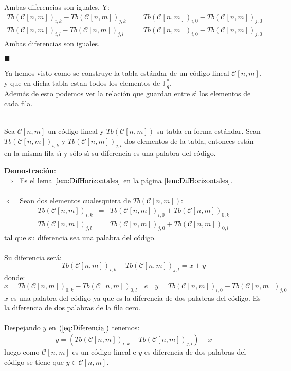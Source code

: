 Ambas diferencias son iguales. Y:
\begin{eqnarray*}
Tb(\mathcal{C}[n,m])_{i,k}-Tb(\mathcal{C}[n,m])_{j,k}&=&
Tb(\mathcal{C}[n,m])_{i,0}-Tb(\mathcal{C}[n,m])_{j,0}\\
Tb(\mathcal{C}[n,m])_{i,l}-Tb(\mathcal{C}[n,m])_{j,l}&=&
Tb(\mathcal{C}[n,m])_{i,0}-Tb(\mathcal{C}[n,m])_{j,0}
\end{eqnarray*}
Ambas diferencias son iguales.
\begin{flushright}
$\blacksquare$
\end{flushright}
%
%
Ya hemos visto como se construye la tabla est\'andar de un c\'odigo lineal 
$\mathcal{C}[n,m]$, y que en dicha tabla estan todos los elementos de
$\mathbb{F}^{^n}_q$.\\

Adem\'as de esto podemos ver la relaci\'on que guardan entre s\'{\i} los 
elementos de cada fila.
%
\newpage
%
\begin{teorema}\label{the:ElementosFila}
\ \\
Sea $\mathcal{C}[n,m]$ un c\'odigo lineal y $Tb(\mathcal{C}[n,m])$ su tabla en
forma est\'andar. Sean $Tb(\mathcal{C}[n,m])_{i,k}$ y
$Tb(\mathcal{C}[n,m])_{j,l}$ dos elementos de la tabla, entonces est\'an en la
misma fila s\'{\i} y s\'olo s\'{\i} su diferencia es una palabra del c\'odigo.
\end{teorema}
\underline{\textbf{Demostraci\'on}}:\\
$\Rightarrow |$ Es el lema $\ref{lem:DifHorizontales}$ en la p\'agina
$\pageref{lem:DifHorizontales}$.\\ \\
%
$\Leftarrow |$ Sean dos elementos cualesquiera de $Tb(\mathcal{C}[n,m])$:
\begin{eqnarray*}
Tb(\mathcal{C}[n,m])_{i,k}&=&Tb(\mathcal{C}[n,m])_{i,0}+
Tb(\mathcal{C}[n,m])_{0,k}\\
Tb(\mathcal{C}[n,m])_{j,l}&=&Tb(\mathcal{C}[n,m])_{j,0}+
Tb(\mathcal{C}[n,m])_{0,l}
\end{eqnarray*}
tal que su diferencia sea una palabra del c\'odigo.\\ \\
%
Su diferencia ser\'a:
\begin{equation} \label{eq:Diferencia}
Tb(\mathcal{C}[n,m])_{i,k}-Tb(\mathcal{C}[n,m])_{j,l} = x + y
\end{equation}
donde:
\begin{displaymath}
x=Tb(\mathcal{C}[n,m])_{0,k}-Tb(\mathcal{C}[n,m])_{0,l}\quad e\quad
y=Tb(\mathcal{C}[n,m])_{i,0}-Tb(\mathcal{C}[n,m])_{j,0}
\end{displaymath}
$x$ es una palabra del c\'odigo ya que es la diferencia de dos palabras
del c\'odigo. Es la diferencia de dos palabras de la fila cero.\\ \\
%
Despejando $y$ en $(\ref{eq:Diferencia})$ tenemos:
\begin{displaymath}
y=(Tb(\mathcal{C}[n,m])_{i,k}-Tb(\mathcal{C}[n,m])_{j,l})-x
\end{displaymath}
luego como $\mathcal{C}[n,m]$ es un c\'odigo lineal e $y$ es diferencia de dos
palabras del c\'odigo se tiene que $y\in \mathcal{C}[n,m]$.\\

